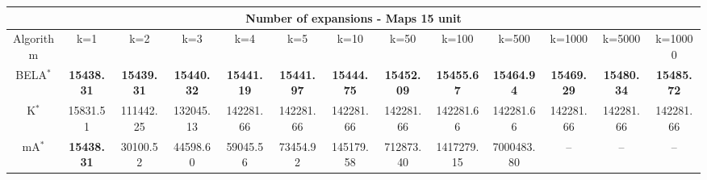 \begin{tabular}{c|cccccccccccc}\toprule
\multicolumn{13}{c}{Number of expansions - Maps 15 unit}\\ \midrule
Algorithm & k=1 & k=2 & k=3 & k=4 & k=5 & k=10 & k=50 & k=100 & k=500 & k=1000 & k=5000 & k=10000 \\ \midrule
BELA$^*$ & \textbf{15438.31} & \textbf{15439.31} & \textbf{15440.32} & \textbf{15441.19} & \textbf{15441.97} & \textbf{15444.75} & \textbf{15452.09} & \textbf{15455.67} & \textbf{15464.94} & \textbf{15469.29} & \textbf{15480.34} & \textbf{15485.72} \\
K$^*$ & 15831.51 & 111442.25 & 132045.13 & 142281.66 & 142281.66 & 142281.66 & 142281.66 & 142281.66 & 142281.66 & 142281.66 & 142281.66 & 142281.66 \\
mA$^*$ & \textbf{15438.31} & 30100.52 & 44598.60 & 59045.56 & 73454.92 & 145179.58 & 712873.40 & 1417279.15 & 7000483.80 & -- & -- & -- \\ \bottomrule 
\end{tabular}
